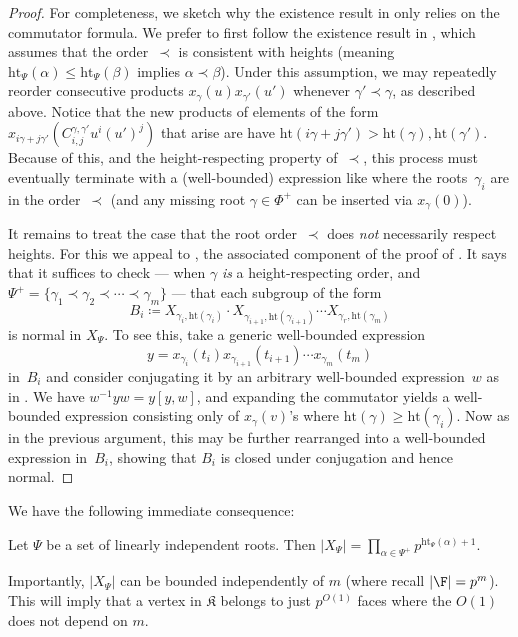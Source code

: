 \documentclass[11pt]{article}
\newcommand{\hgt}{{\mathrm{ht}}}
\newcommand{\complex}{\mathfrak{K}}
\begin{document}
\begin{proof}
    For completeness, we sketch why the existence result in  only relies on the commutator formula.
    We prefer to first follow the existence result in \cite[Thm.~5.3.3]{Car89}, which assumes that the order~$\prec$ is consistent with heights (meaning $\hgt_{\Psi}(\alpha) \leq \hgt_{\Psi}(\beta)$ implies $\alpha \prec \beta$).  Under this assumption, we may repeatedly reorder consecutive products $x_{\gamma}(u)x_{\gamma'}(u')$ whenever $\gamma' \prec \gamma$, as described above.  Notice that the new products of elements of the form $x_{i\gamma + j \gamma'}(C_{i,j}^{\gamma,\gamma'} u^i (u')^j)$ that arise are have $\hgt(i\gamma + j \gamma') > \hgt(\gamma), \hgt(\gamma')$.  Because of this, and the height-respecting property of~$\prec$, this process must eventually terminate with a (well-bounded) expression like  where the roots~$\gamma_i$ are in the order~$\prec$ (and any missing root $\gamma \in \Phi^+$ can be inserted via $x_{\gamma}(0)$).  
    
    It remains to treat the case that the root order~$\prec$ does \emph{not} necessarily respect heights. For this we appeal to \cite[Lem.~18]{Ste16}, the associated component of the proof of .
    It says that it suffices to check --- when $\gamma$ \emph{is} a height-respecting order, and  $\Psi^+ = \{\gamma_1 \prec \gamma_2 \prec \cdots \prec \gamma_m\}$ --- that each subgroup of the form
    \[
        B_i \coloneqq X_{\gamma_i, \hgt(\gamma_i)} \cdot X_{\gamma_{i+1}, \hgt(\gamma_{i+1})} \cdots X_{\gamma_r, \hgt(\gamma_m)} 
    \]
    is normal in $X_\Psi$.  To see this, take a generic well-bounded expression
    \[
        y = x_{\gamma_i}(t_i) x_{\gamma_{i+1}}(t_{i+1})\cdots x_{\gamma_{m}}(t_m)
    \]
    in~$B_i$ and consider conjugating it by an arbitrary well-bounded expression~$w$ as in .  We have $w^{-1} y w = y [y,w]$, and expanding the commutator yields a well-bounded expression consisting only of $x_{\gamma}(v)$'s where $\hgt(\gamma) \geq \hgt(\gamma_i)$.  Now as in the previous argument, this may be further rearranged into a well-bounded expression in~$B_i$, showing that $B_i$ is closed under conjugation and hence normal.
\end{proof}

We have the following immediate consequence:
\begin{corollary}\label{subsize}
    Let $\Psi$ be a set of linearly independent roots. Then
$\displaystyle |X_{\Psi}| = \prod_{\alpha \in \Psi^+} p^{\hgt_{\Psi}(\alpha) + 1}.$
\end{corollary}
Importantly, $|X_{\Psi}|$ can be bounded independently of $m$ (where recall $|\F|=p^m$). This will imply that a vertex in $\complex$ belongs to just $p^{O(1)}$ faces where the $O(1)$ does  not depend on $m$.\\
\end{document}
